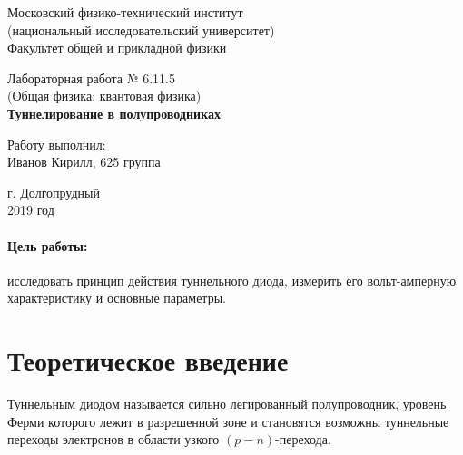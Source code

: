 \documentclass[12pt]{kiarticle}
\begin{document}
	
	\begin{titlepage}
		\begin{center}
			\large 	Московский физико-технический институт \\
				(национальный исследовательский университет) \\
			Факультет общей и прикладной физики \\
			\vspace{0.2cm}
			
			\vspace{4.5cm}
			Лабораторная работа № 6.11.5 \\ \vspace{0.2cm}
			\large (Общая физика: квантовая физика) \\ \vspace{0.2cm}
			\LARGE \textbf{  Туннелирование в полупроводниках }
		\end{center}
		\vspace{2.3cm} \large
		
		\begin{center}
			Работу выполнил: \\
			Иванов Кирилл,
			625 группа
			\vspace{10mm}		
			
		\end{center}
		
		\begin{center} \vspace{60mm}
			г. Долгопрудный \\
			2019 год
		\end{center}
	\end{titlepage}


	\paragraph*{Цель работы:} исследовать принцип действия туннельного диода, измерить его вольт-амперную характеристику и основные параметры. 
	
	
	
	\section{Теоретическое введение}
	
	Туннельным диодом называется сильно легированный полупроводник, уровень Ферми которого лежит в разрешенной зоне и становятся возможны туннельные переходы электронов в области узкого $(p-n)$-перехода. 
	
\end{document}
